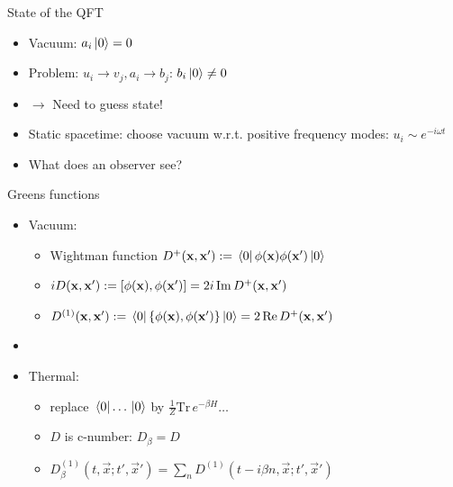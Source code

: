 \documentclass{beamer}
\renewcommand{\va}[1]{\vec{#1}}
\begin{document}
\begin{frame}{State of the QFT}
\begin{itemize}
	\item Vacuum: \(a_i \ket*{0} = 0\)
	\item Problem: \(u_i \to v_j, a_i \to b_j\): \(b_i \ket*{0} \neq 0\)
	\item[] \(\to\) Need to guess state!
	\item Static spacetime: choose vacuum w.r.t. positive frequency modes: \(u_i \sim e^{-i\omega t}\)
	\item What does an observer see? 
\end{itemize}
\end{frame}

\begin{frame}{Greens functions}
\begin{itemize}
	\item Vacuum:
	\begin{itemize}
		\item Wightman function \(D^+(\vb{x},\vb{x}') := \bra*{0}\phi(\vb{x})\phi(\vb{x}')\ket*{0}\)
 		\item \(i D(\vb{x},\vb{x}') := [\phi(\vb{x}),\phi(\vb{x}')] = 2i\,\mathrm{Im}\,D^+(\vb{x},\vb{x}')\)
		\item \(D^{(1)}(\vb{x},\vb{x}') := \bra*{0}\{\phi(\vb{x}),\phi(\vb{x}')\}\ket*{0}= 2\,\mathrm{Re}\,D^+(\vb{x},\vb{x}')\)
	\end{itemize}
	\item[]
	\item Thermal:
	\begin{itemize}
		\item replace \(\bra*{0}\dots\ket*{0}\) by \(\frac{1}{Z} \mathrm{Tr}\,e^{-\beta H} \dots\)
		\item \(D\) is c-number: \(D_\beta = D\)
		\item \(D^{(1)}_\beta(t,\va{x};t',\va{x}') = \sum_n D^{(1)}(t-i\beta n, \va{x};t',\va{x}')\)
	\end{itemize}
\end{itemize}
\end{frame}
\end{document}
